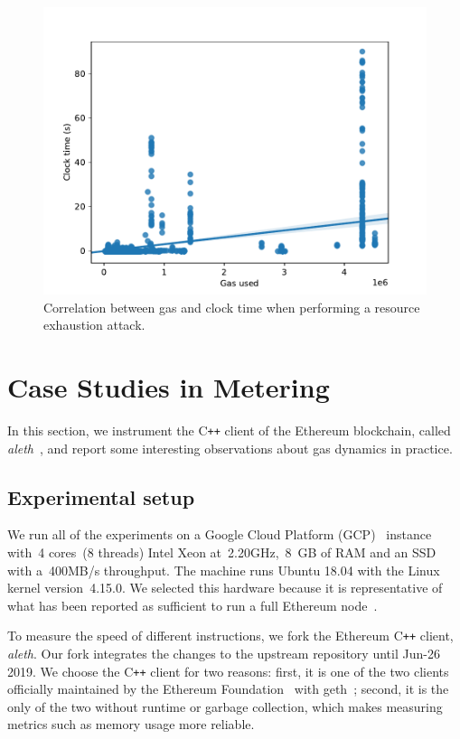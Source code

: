 \begin{figure}[tb]
	\centering\includegraphics[width=\textwidth]{3-vm-security/figures/cpu-gas-extcodesize.pdf}
	\caption{Correlation between gas and clock time when performing a resource exhaustion attack.}
	\label{fig:extcodesize-cpu}
\end{figure}

\section{Case Studies in Metering}
\label{sec:3:case-studies}

In this section, we instrument the C\texttt{++} client of the Ethereum blockchain, called \textit{aleth}~\cite{aleth}, and report some interesting observations about gas dynamics in practice.

\subsection{Experimental setup}
 We run all of the experiments on a Google Cloud Platform (GCP)~\cite{gcp-compute-engine} instance with~4 cores~(8 threads) Intel Xeon at~2.20GHz,~8~GB of RAM and an SSD with a~400MB/s throughput.
The machine runs Ubuntu 18.04 with the Linux kernel version~4.15.0. We selected this hardware because it is representative of what has been reported as sufficient to run a full Ethereum node~\cite{node-incentive,pantheon-system-requirements,eth-hardware-requirements}.

 To measure the speed of different instructions, we fork the Ethereum C\texttt{++} client, \textit{aleth}.
Our fork integrates the changes to the upstream repository until Jun-26 2019.
We choose the C\texttt{++} client for two reasons: first, it is one of the two clients officially maintained by the Ethereum Foundation~\cite{ethereum-foundation-github} with geth~\cite{geth}; second, it is the only of the two without runtime or garbage collection, which makes measuring metrics such as memory usage more reliable.

